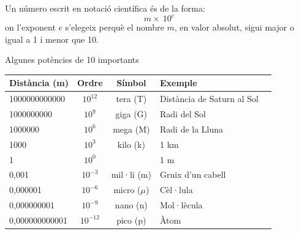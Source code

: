 	
\begin{theorybox}
	
	Un número escrit en notació científica és de la forma:
	\[ m \times \ 10^{e} \]
	on l'exponent $e$ s'elegeix perquè el nombre $m$, en valor absolut, sigui major o igual a 1 i menor que 10.
	
	Algunes potències de 10 importants
\begin{center}
	\renewcommand{\arraystretch}{1.2}
\begin{tabular}{|l|c|c|l|l|}
	\hline
	\rowcolor{lightgray} Distància (m) & Ordre & Símbol & Exemple \\
	\hline
	1000000000000 & $10^{12}$ & tera (T) & Distància de Saturn al Sol\\
	\hline
	1000000000 & $10^9$ & giga (G) & Radi del Sol \\
	\hline
	1000000 & $10^6$ & mega (M) & Radi de la Lluna \\
	\hline
	1000 & $10^3$ & kilo (k) & 1 km \\
	\hline
	1 & $10^0$ &  & 1 m \\
	\hline
	0,001 & $10^{-3}$ & mil·li (m) & Gruix d'un cabell \\
	\hline
	0,000001 & $10^{-6}$ & micro ($\mu$) & Cèl·lula \\
	\hline
	0,000000001 & $10^{-9}$ & nano (n) & Mol·lècula \\
	\hline
		0,000000000001 & $10^{-12}$ & pico (p) & Àtom \\
	\hline
\end{tabular} 
\end{center}
\end{theorybox}
 

